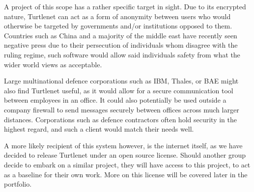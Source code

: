 A project of this scope has a rather specific target in sight. Due to its 
encrypted nature, Turtlenet can act as a form of anonymity between users who 
would otherwise be targeted by governments and/or institutions opposed to 
them. Countries such as China and a majority of the middle east have recently 
seen negative press due to their persecution of individuals whom disagree with
the ruling regime, such software would allow said individuals safety from what
the wider world views as acceptable. 

Large multinational defence corporations such as IBM, Thales, or BAE might also 
find Turtlenet useful, as it would allow for a secure communication tool 
between employees in an office. It could also potentially be used outside a 
company firewall to send messages securely between offices across much larger 
distances. Corporations such as defence contractors often hold security in the 
highest regard, and such a client would match their needs well.

A more likely recipient of this system however, is the internet itself, as we
have decided to release Turtlenet under an open source license. Should another 
group decide to embark on a similar project, they will have access to this 
project, to act as a baseline for their own work. More on this license will be 
covered later in the portfolio.
